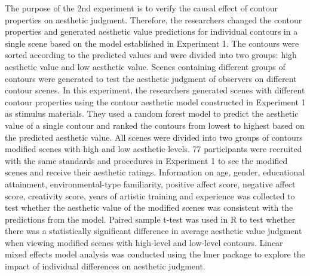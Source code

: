 \documentclass[
  man,floatsintext]{apa6}
\begin{document}
The purpose of the 2nd experiment is to verify the causal effect of contour properties on aesthetic judgment. Therefore, the researchers changed the contour properties and generated aesthetic value predictions for individual contours in a single scene based on the model established in Experiment 1. The contours were sorted according to the predicted values and were divided into two groups: high aesthetic value and low aesthetic value. Scenes containing different groups of contours were generated to test the aesthetic judgment of observers on different contour scenes. In this experiment, the researchers generated scenes with different contour properties using the contour aesthetic model constructed in Experiment 1 as stimulus materials. They used a random forest model to predict the aesthetic value of a single contour and ranked the contours from lowest to highest based on the predicted aesthetic value. All scenes were divided into two groups of contours modified scenes with high and low aesthetic levels. 77 participants were recruited with the same standards and procedures in Experiment 1 to see the modified scenes and receive their aesthetic ratings. Information on age, gender, educational attainment, environmental-type familiarity, positive affect score, negative affect score, creativity score, years of artistic training and experience was collected to test whether the aesthetic value of the modified scenes was consistent with the predictions from the model. Paired sample t-test was used in R to test whether there was a statistically significant difference in average aesthetic value judgment when viewing modified scenes with high-level and low-level contours. Linear mixed effects model analysis was conducted using the lmer package to explore the impact of individual differences on aesthetic judgment.
\end{document}
